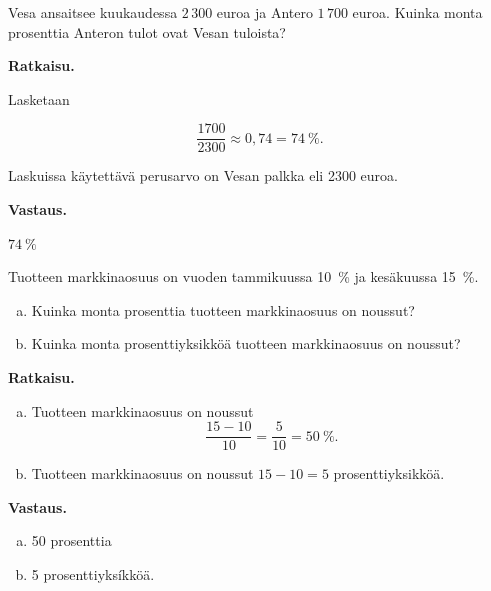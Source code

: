 \begin{esimerkki}
Vesa ansaitsee kuukaudessa ${2\,300}$ euroa ja Antero ${1\,700}$ euroa. Kuinka monta prosenttia Anteron tulot ovat Vesan tuloista? 

\textbf{Ratkaisu.}

Lasketaan

\begin{equation*}
\frac{1700}{2300}  \approx 0,74 = 74 \  \%.
\end{equation*}

Laskuissa käytettävä perusarvo on Vesan palkka eli 2300 euroa.
    
\textbf{Vastaus.}

$74~\%$
\end{esimerkki}





\begin{esimerkki}
    Tuotteen markkinaosuus on vuoden tammikuussa 10~\% ja kesäkuussa 15~\%. 
    \begin{enumerate}[a)]
    \item Kuinka monta prosenttia tuotteen markkinaosuus on noussut?
    
    \item Kuinka monta prosenttiyksikköä tuotteen markkinaosuus on noussut?
    \end{enumerate}
    
    {\bf Ratkaisu.} 
    
    \begin{enumerate}[a)]
    \item Tuotteen markkinaosuus on noussut
    \[
    \frac{15-10}{10} = \frac{5}{10} = 50\ \%.
    \]
    
    \item Tuotteen markkinaosuus on noussut $15-10=5$ prosenttiyksikköä. 
    \end{enumerate}
    
    {\bf Vastaus.}
    
    \begin{enumerate}[a)]
    \item 50 prosenttia
    \item 5 prosenttiyksíkköä.
    \end{enumerate}
\end{esimerkki}

